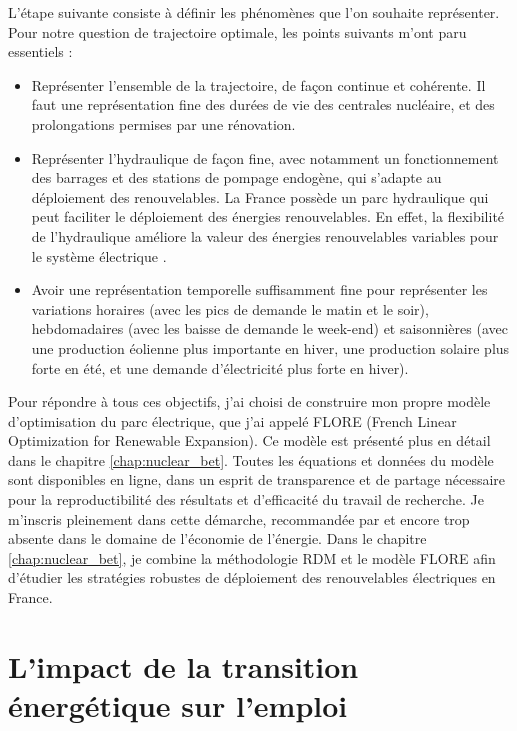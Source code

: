 L’étape suivante consiste à définir les phénomènes que l’on souhaite représenter. Pour notre question de trajectoire optimale, les points suivants m’ont paru essentiels :
\begin{itemize}
	\item Représenter l’ensemble de la trajectoire, de façon continue et cohérente. Il faut une représentation fine des durées de vie des centrales nucléaire, et des prolongations permises par une rénovation.
	\item Représenter l’hydraulique de façon fine, avec notamment un fonctionnement des barrages et des stations de pompage endogène, qui s’adapte au déploiement des renouvelables. La France possède un parc hydraulique qui peut faciliter le déploiement des énergies renouvelables. En effet, la flexibilité de l’hydraulique améliore la valeur des énergies renouvelables variables pour le système électrique \citep{Hirth2016a}.
	\item Avoir une représentation temporelle suffisamment fine pour représenter les variations horaires (avec les pics de demande le matin et le soir), hebdomadaires (avec les baisse de demande le week-end) et saisonnières (avec une production éolienne plus importante en hiver, une production solaire plus forte en été, et une demande d’électricité plus forte en hiver).
\end{itemize}

Pour répondre à tous ces objectifs, j’ai choisi de construire mon propre modèle d’optimisation du parc électrique, que j’ai appelé FLORE (French Linear Optimization for Renewable Expansion). Ce modèle est présenté plus en détail dans le chapitre \ref{chap:nuclear_bet}.
Toutes les équations et données du modèle sont disponibles en ligne, dans un esprit de transparence et de partage nécessaire pour la reproductibilité des résultats et d’efficacité du travail de recherche. Je m’inscris pleinement dans cette démarche, recommandée par \citet{Pfenninger2017} et encore trop absente dans le domaine de l’économie de l’énergie.
Dans le chapitre \ref{chap:nuclear_bet}, je combine la méthodologie RDM et le modèle FLORE afin d’étudier les stratégies robustes de déploiement des renouvelables électriques en France.

\section{L’impact de la transition énergétique sur l’emploi}
\label{sec:intro_emploi}


